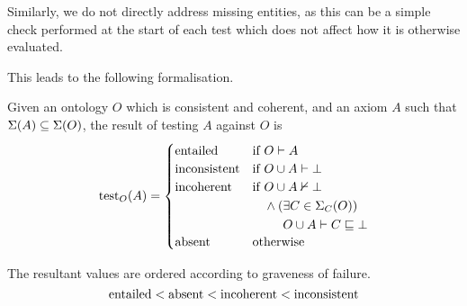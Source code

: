 \documentclass[paper.tex]{subfiles}
\begin{document}
Similarly, we do not directly address missing entities, as this can be a simple check performed at the start of each test which does not affect how it is otherwise evaluated.

This leads to the following formalisation.

\begin{definition}
  Given an ontology $O$ which is consistent and coherent, and an axiom $A$ such that $\Sigma(A) \subseteq \Sigma(O)$, the result of testing $A$ against $O$ is
  \[
    \test_O(A) =
    \begin{cases}
      \entailed &
        \text{if } O \sementails A \\
      \inconsistent &
        \text{if } O \union A \sementails \bot \\
      \incoherent &
        \text{if }
        \! \begin{aligned}[t]
          & O \union A \nsementails \bot \\
          & \land (\exists C \in \signatureC(O)) \\
          & \phantom{{}\land (} O \union A \sementails C \sqsubseteq \bot
        \end{aligned} \\
      \absent &
        \text {otherwise} \\
    \end{cases}
  \]

  The resultant values are ordered according to graveness of failure.
  \[ \mathrm{entailed} < \mathrm{absent} < \mathrm{incoherent} < \mathrm{inconsistent} \]
\end{definition}
\end{document}
